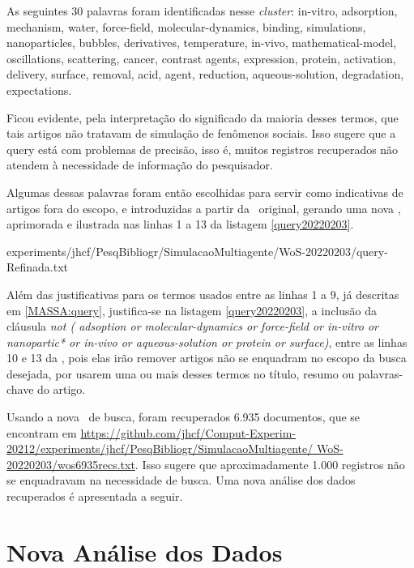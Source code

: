 As seguintes 30 palavras foram identificadas nesse \textit{cluster}:
in-vitro,
adsorption,
mechanism,
water,
force-field,
molecular-dynamics,
binding,
simulations,
nanoparticles,
bubbles,
derivatives,
temperature,
in-vivo,
mathematical-model,
oscillations,
scattering,
cancer,
contrast agents,
expression,
protein,
activation,
delivery,
surface,
removal,
acid,
agent,
reduction,
aqueous-solution,
degradation,
expectations.

Ficou evidente, pela interpretação do significado da maioria desses termos, que tais artigos não tratavam de simulação de fenômenos sociais. Isso sugere que a query está com problemas de precisão, isso é, muitos registros recuperados não atendem à necessidade de informação do pesquisador. 

Algumas dessas palavras foram então escolhidas para servir como indicativas de artigos fora do escopo, e introduzidas a partir da \query\  original, gerando uma nova \query, aprimorada e ilustrada nas linhas 1 a 13 da listagem \ref{query20220203}.


{experiments/jhcf/PesqBibliogr/SimulacaoMultiagente/WoS-20220203/query-Refinada.txt}

Além das justificativas para os termos usados entre as linhas 1 a 9, já descritas em \ref{MASSA:query},  justifica-se na listagem \ref{query20220203}, a inclusão da cláusula \textit{not (
 adsoption or molecular-dynamics or force-field
 or in-vitro or nanopartic* or in-vivo
 or aqueous-solution or protein or surface)}, entre as linhas 10 e 13 da \query, pois elas irão remover artigos não se enquadram no escopo da busca desejada, por usarem uma ou mais desses termos no título, resumo ou palavras-chave do artigo.
 
Usando a nova \query\ de busca, foram recuperados 6.935 documentos, que se encontram em
\url{https://github.com/jhcf/Comput-Experim-20212/experiments/jhcf/PesqBibliogr/SimulacaoMultiagente/ WoS-20220203/wos6935recs.txt}. Isso sugere que aproximadamente 1.000 registros não se enquadravam na necessidade de busca.
Uma nova análise dos dados recuperados é apresentada a seguir.

\section{Nova Análise dos Dados}

